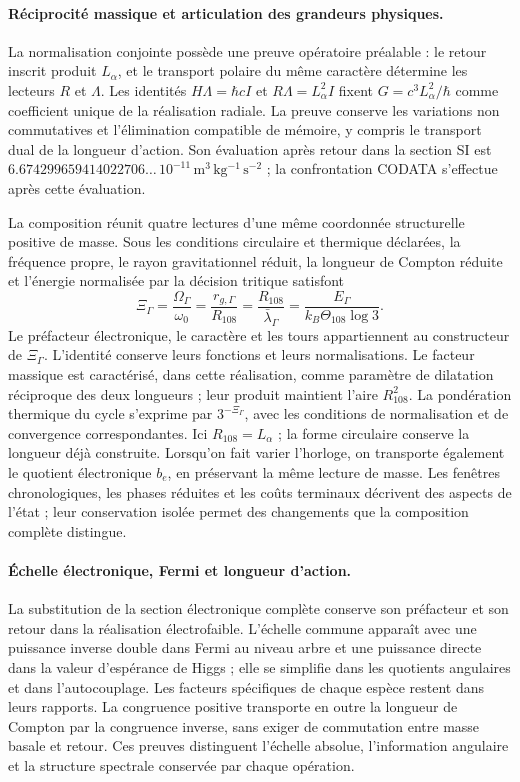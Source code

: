 \paragraph{Réciprocité massique et articulation des grandeurs physiques.}
La normalisation conjointe possède une preuve opératoire préalable :
le retour inscrit produit $L_\alpha$, et le transport polaire du même
caractère détermine les lecteurs $R$ et $\Lambda$.
Les identités $H\Lambda=\hbar cI$ et $R\Lambda=L_\alpha^2I$ fixent
$G=c^3L_\alpha^2/\hbar$ comme coefficient unique de la réalisation radiale.
La preuve conserve les variations non commutatives et l’élimination compatible
de mémoire, y compris le transport dual de la longueur d’action.
Son évaluation après retour dans la section SI est
$6.674299659414022706\ldots\,10^{-11}\,\mathrm{m^3\,kg^{-1}\,s^{-2}}$ ;
la confrontation CODATA s’effectue après cette évaluation.

La composition réunit quatre lectures d’une même coordonnée
structurelle positive de masse. Sous les conditions circulaire et thermique
déclarées, la fréquence propre, le rayon gravitationnel réduit, la
longueur de Compton réduite et l’énergie normalisée par la décision
tritique satisfont
\[
 \Xi_\Gamma=
 \frac{\Omega_\Gamma}{\omega_0}
 =\frac{r_{g,\Gamma}}{R_{108}}
 =\frac{R_{108}}{\bar\lambda_\Gamma}
 =\frac{E_\Gamma}{k_B\Theta_{108}\log3}.
\]
Le préfacteur électronique, le caractère et les tours appartiennent au
constructeur de \(\Xi_\Gamma\). L’identité conserve leurs fonctions et
leurs normalisations. Le facteur massique est caractérisé, dans cette réalisation,
comme paramètre de dilatation réciproque des deux longueurs ; leur produit
maintient l’aire \(R_{108}^2\). La pondération thermique du cycle
s’exprime par \(3^{-\Xi_\Gamma}\), avec les conditions de
normalisation et de convergence correspondantes.
Ici $R_{108}=L_\alpha$ ; la forme circulaire conserve la longueur déjà
construite. Lorsqu’on fait varier l’horloge, on transporte également le quotient électronique
$b_e$, en préservant la même lecture de masse. Les fenêtres chronologiques,
les phases réduites et les coûts terminaux décrivent des aspects de l’état ;
leur conservation isolée permet des changements que la composition complète distingue.

\paragraph{Échelle électronique, Fermi et longueur d’action.}
La substitution de la section électronique complète conserve son préfacteur
et son retour dans la réalisation électrofaible. L’échelle commune
apparaît avec une puissance inverse double dans Fermi au niveau arbre et une puissance
directe dans la valeur d’espérance de Higgs ; elle se simplifie dans les
quotients angulaires et dans l’autocouplage. Les facteurs spécifiques
de chaque espèce restent dans leurs rapports. La congruence positive
transporte en outre la longueur de Compton par la congruence inverse,
sans exiger de commutation entre masse basale et retour. Ces preuves
distinguent l’échelle absolue, l’information angulaire et la structure
spectrale conservée par chaque opération.

